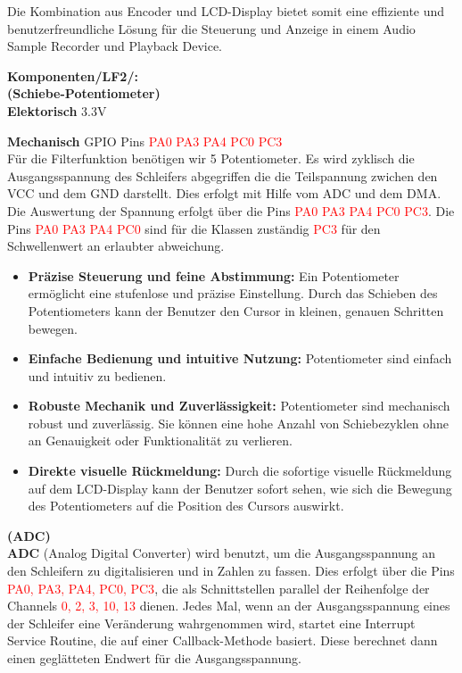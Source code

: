 Die Kombination aus Encoder und LCD-Display bietet somit eine effiziente und benutzerfreundliche Lösung für die Steuerung und Anzeige in einem Audio Sample Recorder und Playback Device.

\newpage
\textbf{Komponenten/LF2/:}\\

\textbf{(Schiebe-Potentiometer)}\\

\textbf{Elektorisch} 3.3V

\textbf{Mechanisch} GPIO Pins  \textcolor{red}{PA0 PA3 PA4 PC0 PC3} \\

Für die Filterfunktion benötigen wir 5 Potentiometer. Es wird zyklisch die Ausgangsspannung des Schleifers abgegriffen die die Teilspannung zwichen den VCC und dem GND darstellt. Dies erfolgt mit Hilfe vom ADC und dem DMA. Die Auswertung der Spannung erfolgt über die Pins  \textcolor{red}{PA0 PA3 PA4 PC0 PC3}. Die Pins  \textcolor{red}{PA0 PA3 PA4 PC0} sind für die Klassen zuständig  \textcolor{red}{PC3} für den Schwellenwert an erlaubter abweichung.

\begin{itemize}
    \item \textbf{Präzise Steuerung und feine Abstimmung:} Ein Potentiometer ermöglicht eine stufenlose und präzise Einstellung. Durch das Schieben des Potentiometers kann der Benutzer den Cursor in kleinen, genauen Schritten bewegen.
    \item \textbf{Einfache Bedienung und intuitive Nutzung:} Potentiometer sind einfach und intuitiv zu bedienen.
    \item \textbf{Robuste Mechanik und Zuverlässigkeit:} Potentiometer sind mechanisch robust und zuverlässig. Sie können eine hohe Anzahl von Schiebezyklen ohne an Genauigkeit oder Funktionalität zu verlieren.
    \item \textbf{Direkte visuelle Rückmeldung:} Durch die sofortige visuelle Rückmeldung auf dem LCD-Display kann der Benutzer sofort sehen, wie sich die Bewegung des Potentiometers auf die Position des Cursors auswirkt.
\end{itemize}

\textbf{(ADC)}\\

\textbf{ADC} (Analog Digital Converter) wird benutzt, um die Ausgangsspannung an den Schleifern zu digitalisieren und in Zahlen zu fassen. Dies erfolgt über die Pins \textcolor{red}{PA0, PA3, PA4, PC0, PC3}, die als Schnittstellen parallel der Reihenfolge der Channels \textcolor{red}{0, 2, 3, 10, 13} dienen. Jedes Mal, wenn an der Ausgangsspannung eines der Schleifer eine Veränderung wahrgenommen wird, startet eine Interrupt Service Routine, die auf einer Callback-Methode basiert. Diese berechnet dann einen geglätteten Endwert für die Ausgangsspannung. \\

